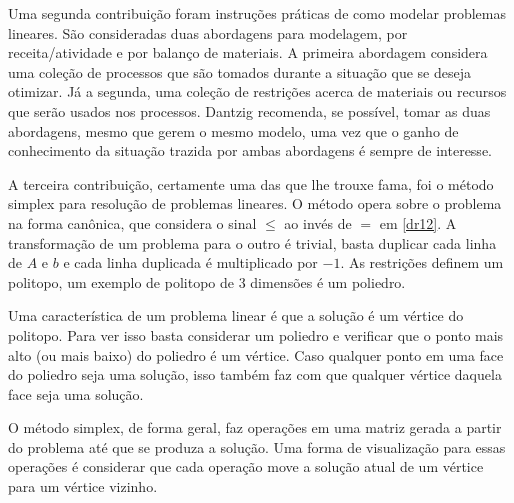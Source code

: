 Uma segunda contribuição foram instruções práticas de como modelar problemas lineares.
São consideradas duas abordagens para modelagem, por receita/atividade e por balanço
de materiais. A primeira abordagem considera uma coleção de processos que são tomados
durante a situação que se deseja otimizar. Já a segunda, uma coleção de restrições acerca
de materiais ou recursos que serão usados nos processos. Dantzig recomenda, se possível,
tomar as duas abordagens, mesmo que gerem o mesmo modelo, uma vez que o ganho de conhecimento
da situação trazida por ambas abordagens é sempre de interesse.

A terceira contribuição, certamente uma das que lhe trouxe fama, foi o método simplex para
resolução de problemas lineares. O método opera sobre o problema na forma canônica, que
considera o sinal \(\leq\) ao invés de \(=\) em \ref{dr12}. A transformação de um problema
para o outro é trivial, basta duplicar cada linha de \(A\) e \(b\) e cada linha duplicada
é multiplicado por \(-1\). As restrições definem um politopo, um exemplo de politopo
de 3 dimensões é um poliedro.

Uma característica de um problema linear é que a solução é um vértice do politopo. Para ver
isso basta considerar um poliedro e verificar que o ponto mais alto (ou mais baixo) do
poliedro é um vértice. Caso qualquer ponto em uma face do poliedro seja uma solução, isso
também faz com que qualquer vértice daquela face seja uma solução.

O método simplex, de forma geral, faz operações em uma matriz gerada a partir do problema
até que se produza a solução. Uma forma de visualização para essas operações é considerar
que cada operação move a solução atual de um vértice para um vértice vizinho.